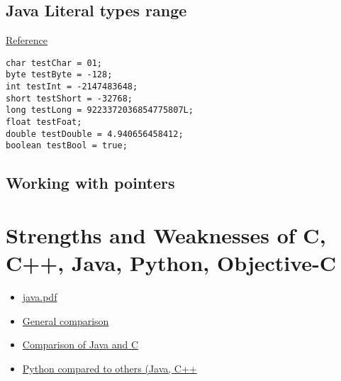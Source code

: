 \documentclass[letterpaper]{article}
\begin{document}
%


\subsection{Java Literal types range}
\href{http://www.jchq.net/certkey/0406certkey.htm}{Reference}
\begin{lstlisting}
char testChar = 01;
byte testByte = -128;
int testInt = -2147483648;
short testShort = -32768;
long testLong = 9223372036854775807L;
float testFoat;
double testDouble = 4.940656458412;
boolean testBool = true;
\end{lstlisting}
\subsection{Working with pointers}

\section{Strengths and Weaknesses of C, C++, Java, Python, Objective-C}
\begin{itemize}
\item
\href{https://files.nyu.edu/ahl266/public/java.pdf}{java.pdf}
\item
\href{http://introcs.cs.princeton.edu/java/faq/c2java.html}{General comparison}
\item
\href{http://en.wikipedia.org/wiki/Comparison_of_Java_and_C}{Comparison of Java and C} 
\item
\href{http://www.python.org/doc/essays/comparisons.html}{Python compared to others (Java, C++}
\end{itemize}
\end{document}
